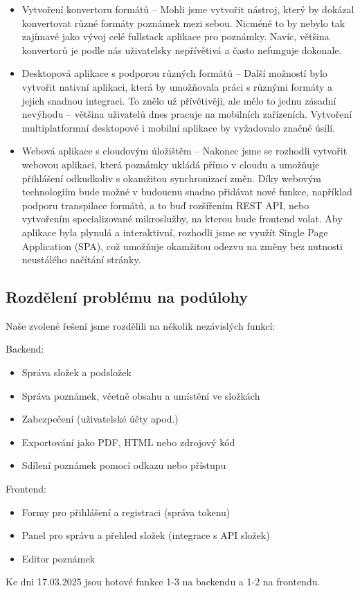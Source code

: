 \begin{itemize}
	\item Vytvoření konvertoru formátů -- Mohli jsme vytvořit nástroj, který by dokázal konvertovat různé formáty poznámek mezi sebou. Nicméně to by nebylo tak zajímavé jako vývoj celé fullstack aplikace pro poznámky. Navíc, většina konvertorů je podle nás uživatelsky nepřívětivá a často nefunguje dokonale.
	
	\item Desktopová aplikace s podporou různých formátů -- Další možností bylo vytvořit nativní aplikaci, která by umožňovala práci s různými formáty a jejich snadnou integraci. To znělo už přívětivěji, ale mělo to jednu zásadní nevýhodu -- většina uživatelů dnes pracuje na mobilních zařízeních. Vytvoření multiplatformní desktopové i mobilní aplikace by vyžadovalo značné úsilí.
	
	\item Webová aplikace s cloudovým úložištěm -- Nakonec jsme se rozhodli vytvořit webovou aplikaci, která poznámky ukládá přímo v cloudu a umožňuje přihlášení odkudkoliv s okamžitou synchronizací změn. Díky webovým technologiím bude možné v budoucnu snadno přidávat nové funkce, například podporu transpilace formátů, a to buď rozšířením REST API, nebo vytvořením specializované mikroslužby, na kterou bude frontend volat. Aby aplikace byla plynulá a interaktivní, rozhodli jsme se využít Single Page Application (SPA), což umožňuje okamžitou odezvu na změny bez nutnosti neustálého načítání stránky.
\end{itemize}

\subsection{Rozdělení problému na podúlohy}

Naše zvolené řešení jsme rozdělili na několik nezávislých funkcí:

\begin{minipage}[t]{0.45\textwidth}
	\vfill
	{\large{Backend:}}
	
	\begin{itemize}
		\item Správa složek a podsložek
		\item Správa poznámek, včetně obsahu a umístění ve složkách
		\item Zabezpečení (uživatelské účty apod.)
		\item Exportování jako PDF, HTML nebo zdrojový kód
		\item Sdílení poznámek pomocí odkazu nebo přístupu
	\end{itemize}
	\vfill
\end{minipage}
\hfill
\begin{minipage}[t]{0.45\textwidth}
	\vfill
	{\large{Frontend:}}
	
	\begin{itemize}
		\item Formy pro přihlášení a registraci (správa tokenu)
		\item Panel pro správu a přehled složek (integrace s API složek)
		\item Editor poznámek
	\end{itemize}
	\vfill
\end{minipage}

Ke dni 17.03.2025 jsou hotové funkce 1-3 na backendu a 1-2 na frontendu.
